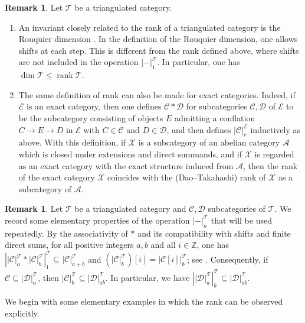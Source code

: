 \documentclass[10pt]{amsart}
\theoremstyle{definition}
\newtheorem{rem}[thm]{Remark}
\theoremstyle{remark}
\numberwithin{equation}{thm}
\def\A{\mathcal{A}}
\def\C{\mathcal{C}}
\def\D{\mathcal{D}}
\def\dim{\operatorname{dim}}
\def\rank{\operatorname{rank}}
\def\T{\mathcal{T}}
\def\X{\mathcal{X}}
\begin{document}
\begin{rem}\label{rem_rank}
Let $\T$ be a triangulated category.
\begin{enumerate}[\rm(1)]
\item
An invariant closely related to the rank of a triangulated category is the Rouquier dimension \cite{Rou}.  
In the definition of the Rouquier dimension, one allows shifts at each step.
This is different from the rank defined above, where shifts are not included in the operation ${|-|}_{1}^{\T}$. 
In particular, one has $\dim \T\leq \rank \T$.
\item
The same definition of rank can also be made for exact categories. 
Indeed, if $\mathcal{E}$ is an exact category, then one defines $\C\ast\D$ for subcategories $\C,\D$ of $\mathcal{E}$ to be the subcategory consisting of objects $E$ admitting a conflation $C\to E\to D$ in $\mathcal{E}$ with $C\in\C$ and $D\in\D$, and then defines ${|\C|}_{r}^{\mathcal{E}}$ inductively as above.
With this definition, if $\X$ is a subcategory of an abelian category $\A$ which is closed under extensions and direct summands, and if $\X$ is regarded as an exact category with the exact structure induced from $\A$, then the rank of the exact category $\X$ coincides with the (Dao--Takahashi) rank of $\X$ as a subcategory of $\A$.
\end{enumerate}
\end{rem}
\begin{rem}\label{rem_basic_rank} 
Let $\T$ be a triangulated category and $\C,\D$ subcategories of $\T$. 
We record some elementary properties of the operation ${|-|}_{n}^{\T}$ that will be used repeatedly. 
By the associativity of $\ast$ and its compatibility with shifts and finite direct sums, for all positive integers $a,b$ and all $i\in\mathbb{Z}$, one has ${\left|{|\C|}_{a}^{\T}\ast{|\C|}_{b}^{\T}\right|}_{1}^{\T}\subseteq{|\C|}_{a+b}^{\T}$ and $({|\C|}_{b}^{\T})[i]={|\C[i]|}_{b}^{\T}$; see \cite[Lemma 2.3]{T2023c}. 
Consequently, if $\C\subseteq{|\D|}_{a}^{\T}$, then ${|\C|}_{b}^{\T}\subseteq{|\D|}_{ab}^{\T}$.
In particular, we have ${\left|{|\D|}_{a}^{\T}\right|}_{b}^{\T}\subseteq{|\D|}_{ab}^{\T}$. 
\end{rem} 
We begin with some elementary examples in which the rank can be observed explicitly.
\end{document}
